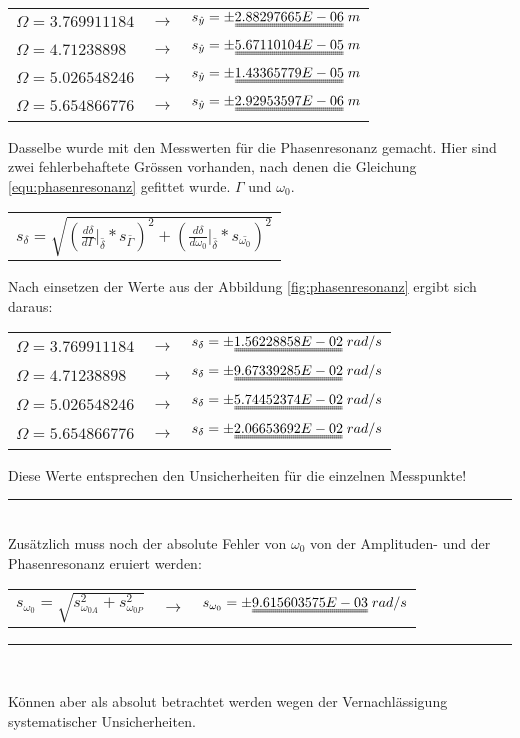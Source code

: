 \begin{table}[H]
\centering
\begin{tabular}{lcl}
$\Omega= 3.769911184$ & $\rightarrow$ & $s_{\hat{y}}=\pm\uuline{2.88297665E-06}\;m$\\
$\Omega= 4.71238898$  & $\rightarrow$ & $s_{\hat{y}}=\pm\uuline{5.67110104E-05}\;m$\\
$\Omega= 5.026548246$ & $\rightarrow$ & $s_{\hat{y}}=\pm\uuline{1.43365779E-05}\;m$\\
$\Omega= 5.654866776$ & $\rightarrow$ & $s_{\hat{y}}=\pm\uuline{2.92953597E-06}\;m$\\
\end{tabular} 
\end{table}
Dasselbe wurde mit den Messwerten für die Phasenresonanz gemacht. Hier sind zwei fehlerbehaftete Grössen vorhanden, nach denen die Gleichung \ref{equ:phasenresonanz} gefittet wurde. $\Gamma$ und $\omega_{0}$.
\begin{table}[H]
\centering
\begin{tabular}{c}
{\Large $s_{\delta}=\sqrt{(\frac{d\delta}{d\Gamma}\bigg\vert_{\bar{\delta}}*s_{\bar{\Gamma}})^{2} + (\frac{d\delta}{d\omega_{0}}\bigg\vert_{\bar{\delta}}*s_{\bar{\omega_{0}}})^{2}}$}
\end{tabular} 
\end{table}
Nach einsetzen der Werte aus der Abbildung \ref{fig:phasenresonanz} ergibt sich daraus:
\begin{table}[H]
\centering
\begin{tabular}{lcl}
$\Omega= 3.769911184$ & $\rightarrow$ & $s_{\delta}=\pm\uuline{1.56228858E-02}\;rad/s$\\
$\Omega= 4.71238898$  & $\rightarrow$ & $s_{\delta}=\pm\uuline{9.67339285E-02}\;rad/s$\\
$\Omega= 5.026548246$ & $\rightarrow$ & $s_{\delta}=\pm\uuline{5.74452374E-02}\;rad/s$\\
$\Omega= 5.654866776$ & $\rightarrow$ & $s_{\delta}=\pm\uuline{2.06653692E-02}\;rad/s$\\
\end{tabular} 
\end{table}
Diese Werte entsprechen den Unsicherheiten für die einzelnen Messpunkte!\\
\noindent\rule{\textwidth}{0.4pt}
\\[0.4cm]
Zusätzlich muss noch der absolute Fehler von $\omega_{0}$ von der Amplituden- und der Phasenresonanz eruiert werden:
\begin{table}[H]
\centering
\begin{tabular}{ccc}
$s_{\omega_{0}}=\sqrt{s_{\omega_{0A}}^{2}+s_{\omega_{0P}}^{2}}$ & $\rightarrow$ & $s_{\omega_{0}}=\pm\uuline{9.615603575E-03}\;rad/s$
\end{tabular} 
\end{table}
\noindent\rule{\textwidth}{0.4pt}
\\[0.4cm]
\begin{center}
\end{center}
Können aber als absolut betrachtet werden wegen der Vernachlässigung systematischer Unsicherheiten.
\newpage